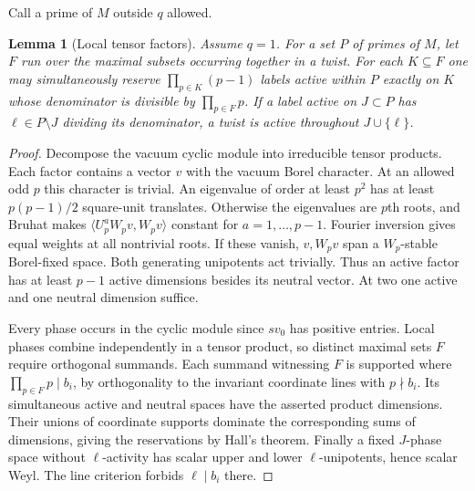 \documentclass[11pt]{amsart}
\numberwithin{equation}{section}
\newtheorem{lemma}[theorem]{Lemma}
\theoremstyle{definition}
\theoremstyle{plain}
\begin{document}
Call a prime of $M$ outside $q$ allowed.
\begin{lemma}[Local tensor factors]
Assume $q=1$. For a set $P$ of primes of $M$, let $F$ run over
the maximal subsets occurring together in a twist. For each
$K\subseteq F$ one may simultaneously reserve $\prod_{p\in K}(p-1)$
labels active within $P$ exactly on $K$ whose denominator is
divisible by $\prod_{p\in F}p$. If a label active on $J\subset P$
has $\ell\in P\setminus J$ dividing its denominator, a twist is
active throughout $J\cup\{\ell\}$.
\end{lemma}
\begin{proof}
Decompose the vacuum cyclic module into irreducible tensor products.
Each factor contains a vector $v$ with the vacuum Borel character.
At an allowed odd $p$ this character is trivial. An eigenvalue of order at least $p^2$
has at least $p(p-1)/2$ square-unit translates.
Otherwise the eigenvalues are $p$th roots, and Bruhat makes
$\langle U_p^aW_pv,W_pv\rangle$ constant for $a=1,\ldots,p-1$.
Fourier inversion gives equal weights at all nontrivial roots.
If these vanish, $v,W_pv$ span a $W_p$-stable Borel-fixed space.
Both generating unipotents act trivially. Thus an active factor has
at least $p-1$ active dimensions besides its neutral vector. At two
one active and one neutral dimension suffice.

Every phase occurs in the cyclic module since $sv_0$ has positive
entries. Local phases combine independently in a tensor product,
so distinct maximal sets $F$ require orthogonal summands. Each
summand witnessing $F$ is supported where $\prod_{p\in F}p\mid b_i$,
by orthogonality to the invariant coordinate lines with $p\nmid b_i$.
Its simultaneous active and neutral spaces have the asserted product
dimensions. Their unions of coordinate supports dominate the
corresponding sums of dimensions, giving the reservations by Hall's
theorem. Finally a fixed $J$-phase space without $\ell$-activity
has scalar upper and lower $\ell$-unipotents, hence scalar Weyl.
The line criterion forbids $\ell\mid b_i$ there.
\end{proof}
\end{document}
